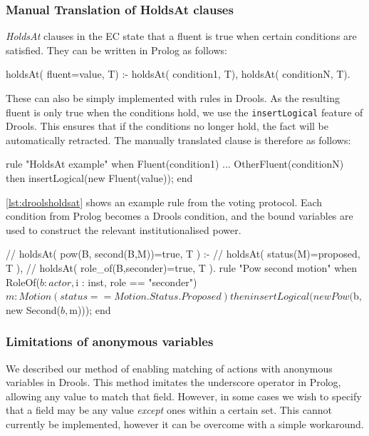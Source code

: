 \subsubsection*{Manual Translation of HoldsAt clauses}

\emph{HoldsAt} clauses in the \ac{EC} state that a fluent is true when certain
conditions are satisfied. They can be written in Prolog as follows:

\begin{prologinline}
holdsAt( fluent=value, T) :-
	holdsAt( condition1, T),
	holdsAt( conditionN, T).
\end{prologinline}

These can also be simply implemented with rules in Drools. As the resulting fluent is only true when the conditions hold, we use the \texttt{insertLogical} feature of Drools. This ensures that if the conditions no longer hold, the fact will be automatically retracted. The manually translated clause is therefore as follows:

\begin{droolsinline}
rule "HoldsAt example"
when
	Fluent(condition1)
	...
	OtherFluent(conditionN)
then
	insertLogical(new Fluent(value));
end
\end{droolsinline}

\autoref{lst:droolsholdsat} shows an example rule from the voting protocol. Each
condition from Prolog becomes a Drools condition, and the bound variables are
used to construct the relevant institutionalised power.

\begin{drools}[label=lst:droolsholdsat,caption={[Example of a manually translated holdsAt clause.]Example of a manually translated holdsAt clause. The original Prolog specification is shown in the comment above the rule.}]
//	holdsAt( pow(B, second(B,M))=true, T ) :-
//		holdsAt( status(M)=proposed, T ),
//		holdsAt( role_of(B,seconder)=true, T ).
rule "Pow second motion"
	when
		RoleOf($b : actor, $i : inst, role == "seconder")
		$m : Motion(status == Motion.Status.Proposed)
	then
		insertLogical(new Pow($b, new Second($b, $m)));
end
\end{drools}

\subsubsection*{Limitations of anonymous variables}

We described our method of enabling matching of actions with anonymous
variables in Drools. This method imitates the underscore operator in Prolog,
allowing any value to match that field. However, in some cases we wish to
specify that a field may be any value \emph{except} ones within a certain set.
This cannot currently be implemented, however it can be overcome with a simple
workaround.

